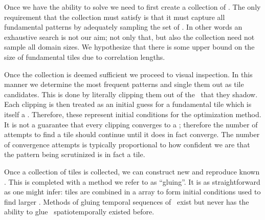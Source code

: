 
Once we have the ability to solve  we need to first create a collection
of \twots. The only requirement that the collection must satisfy is that it must capture
all fundamental patterns by adequately sampling the set of \twots. In other words an exhaustive
search is not our aim; not only that, but also the collection need not sample all {\spt} domain sizes.
We hypothesize that there is some upper bound on the {\spt} size of fundamental tiles due to {\spt}
correlation lengths.

Once the collection is deemed sufficient we proceed to visual inspection. In this manner
we determine the most frequent patterns and single them out as tile candidates. This is
done by literally clipping them out of the \twots\ that they shadow. Each clipping is
then treated as an initial guess for a fundamental tile which is itself a \twot. Therefore,
these represent initial conditions for the optimization method. It is not a guarantee
that every clipping converges to a \twot; therefore the number of attempts to find a tile
should continue until it does in fact converge. The number of convergence attempts is typically
proportional to how confident we are that the pattern being scrutinized is in fact a tile.

Once a collection of tiles is collected, we can construct new and reproduce known \twots.
This is completed with a method we refer to as ``gluing''. It is as straightforward as one
might infer: tiles are combined in a {\spt} array to form initial conditions used to find larger
\twots. Methods of gluing temporal sequences of \twots\ exist but never has the ability to
glue \twots\ spatiotemporally existed before.

